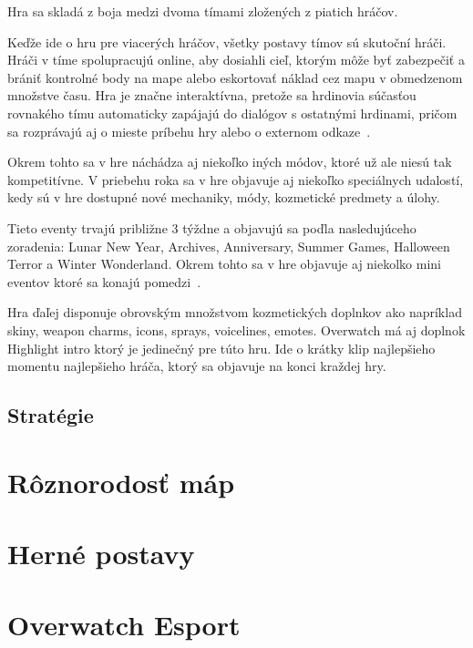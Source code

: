 \documentclass[10pt,oneside,slovak,a4paper]{article}
\begin{document}
Hra sa skladá z boja medzi dvoma tímami zložených z piatich hráčov. 

Keďže ide o hru pre viacerých hráčov, všetky postavy tímov sú skutoční hráči. Hráči v tíme spolupracujú online, aby dosiahli cieľ, ktorým môže byť zabezpečiť a brániť kontrolné body na mape alebo eskortovať náklad cez mapu v obmedzenom množstve času. Hra je značne interaktívna, pretože sa hrdinovia súčasťou rovnakého tímu automaticky zapájajú do dialógov s ostatnými hrdinami, pričom sa rozprávajú aj o mieste príbehu hry alebo o externom odkaze~\cite{Overwatchbook}.

Okrem tohto sa v hre náchádza aj niekoľko iných módov, ktoré už ale niesú tak kompetitívne. V priebehu roka sa v hre objavuje aj niekoľko speciálnych udalostí,
 kedy sú v hre dostupné nové mechaniky, módy, kozmetické predmety a úlohy.

Tieto eventy trvajú približne 3 týždne a objavujú sa poďla nasledujúceho
zoradenia: Lunar New Year, Archives, Anniversary, Summer Games, Halloween Terror a Winter Wonderland. Okrem tohto sa v hre objavuje aj niekolko mini eventov ktoré sa konajú pomedzi~\cite{Overwatchbook}.



Hra ďaľej disponuje obrovským množstvom kozmetických doplnkov ako napríklad skiny, weapon charms, icons, sprays, voicelines, emotes. Overwatch
má aj doplnok Highlight intro ktorý je jedinečný pre túto hru. Ide o krátky klip najlepšieho momentu najlepšieho hráča, ktorý sa objavuje na konci kraždej hry.



\subsection{Stratégie} \label{ina:nejake}




\section{Rôznorodosť máp} \label{Rôznorodosť máp}






\section{Herné postavy} \label{Herné postavy}



\section{Overwatch Esport} \label{Overwatch Esport}
\end{document}
